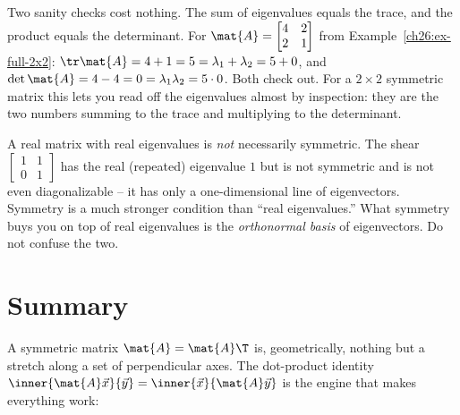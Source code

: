 \begin{example}
\label{ch26:ex-trace-det}
Two sanity checks cost nothing. The sum of eigenvalues equals the trace, and the
product equals the determinant. For $\mat{A}=\begin{bmatrix}4&2\\2&1\end{bmatrix}$
from Example~\ref{ch26:ex-full-2x2}: $\tr\mat{A}=4+1=5=\lambda_1+\lambda_2=5+0$,
and $\det\mat{A}=4-4=0=\lambda_1\lambda_2=5\cdot 0$. Both check out. For a
$2\times 2$ symmetric matrix this lets you read off the eigenvalues almost by
inspection: they are the two numbers summing to the trace and multiplying to the
determinant.
\end{example}

\begin{trapbox}
A real matrix with real eigenvalues is \emph{not} necessarily symmetric. The shear
$\begin{bmatrix}1&1\\0&1\end{bmatrix}$ has the real (repeated) eigenvalue $1$ but
is not symmetric and is not even diagonalizable -- it has only a one-dimensional
line of eigenvectors. Symmetry is a much stronger condition than ``real
eigenvalues.'' What symmetry buys you on top of real eigenvalues is the
\emph{orthonormal basis} of eigenvectors. Do not confuse the two.
\end{trapbox}

\section{Summary}
\label{ch26:summary}

A symmetric matrix $\mat{A}=\mat{A}\T$ is, geometrically, nothing but a stretch
along a set of perpendicular axes. The dot-product identity
$\inner{\mat{A}\vec{x}}{\vec{y}}=\inner{\vec{x}}{\mat{A}\vec{y}}$ is the engine
that makes everything work:

